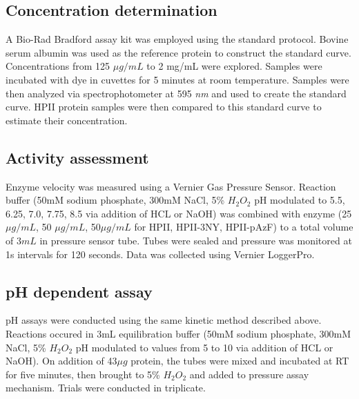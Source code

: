 \documentclass[9pt,twocolumn,twoside]{pnas-new}
\begin{document}
{\subsection*{Concentration determination}
A Bio-Rad Bradford assay kit was employed using the standard protocol. Bovine serum albumin was used as the reference protein to construct the standard curve. Concentrations from 125 $\mu g / mL$ to 2 mg/mL were explored. Samples were incubated with dye in cuvettes for 5 minutes at room temperature. Samples were then analyzed via spectrophotometer at 595 \textit{nm} and used to create the standard curve. HPII protein samples were then compared to this standard curve to estimate their concentration.\\

\subsection*{Activity assessment}
Enzyme velocity was measured using a Vernier Gas Pressure Sensor. Reaction buffer (50mM sodium phosphate, 300mM NaCl, 5\% $H_2O_2$ pH modulated to 5.5, 6.25, 7.0, 7.75, 8.5 via addition of HCL or NaOH) was combined with enzyme (25 $\mu g/mL$, 50 $\mu g/mL$, 50$\mu g/mL$ for HPII, HPII-3NY, HPII-pAzF) to a total volume of $3mL$ in pressure sensor tube. Tubes were sealed and pressure was monitored at 1s intervals for 120 seconds. Data was collected using Vernier LoggerPro.\\

\subsection*{pH dependent assay}
pH assays were conducted using the same kinetic method described above. Reactions occured in 3mL equilibration buffer (50mM sodium phosphate, 300mM NaCl, 5\% $H_2O_2$ pH modulated to values from 5 to 10 via addition of HCL or NaOH). On addition of 43$\mu g$ protein, the tubes were mixed and incubated at RT for five minutes, then brought to 5\% $H_2O_2$ and added to pressure assay mechanism. Trials were conducted in triplicate.\\
}

\showmatmethods %

\pnasbreak


\end{document}
